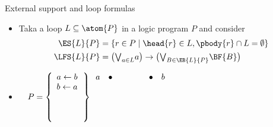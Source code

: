 \begin{frame}{External support and loop formulas}
  \small
  \begin{itemize}
  \item
    Taka a loop $L\subseteq\atom{P}$ in a logic program $P$ and consider
    \begin{align*}
      \ES{L}{P}  & =\{  r\in P\mid\head{r}\in L, \pbody{r}\cap L=\emptyset  \}
      \\
      \LFS{L}{P} & =
                   \big(
                   \textstyle{\bigvee_{a\in L}} a
                   \big)
                   \rightarrow
                   \big(
                   \textstyle{\bigvee_{B\in\EB{L}{P}}}\BF{B}
                   \big)
    \end{align*}
  \item {}
    \par\medskip
    \(
    \quad
    P
    =
    \left\{
      \begin{array}{l}
        a\leftarrow b\\
        b\leftarrow a\\
        \phantom{a\leftarrow x}\\
        \phantom{x\leftarrow y}\\
        \phantom{y\leftarrow x}
      \end{array}
    \right\}
    \hfill
    \begin{array}[b]{lcp{24pt}crp{24pt}}
      a & \bullet & & \bullet & b &\\[12pt]\\
    \end{array}
    \qquad
    \)
  \end{itemize}
\end{frame}
%
